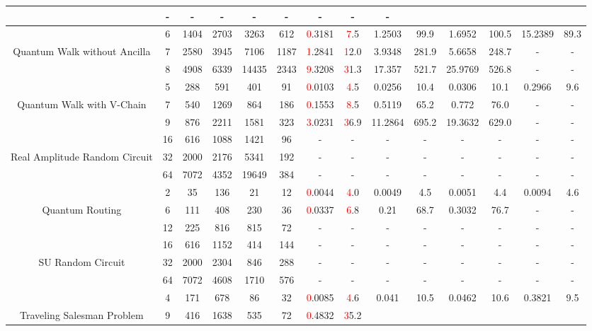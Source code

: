 \begin{table}[htb]
{\begin{tabular}{|c|c|c|c|c|c|c|c|c|c|c|c|c|c|}
 & - & -
 & - & -
 & - & -
 & - & -
 \\
\hline
 & 
6 & 1404 & 2703 & 3263 & 612
 & \textcolor{red}0.3181 & \textcolor{red}7.5
 & 1.2503 & 99.9
 & 1.6952 & 100.5
 & 15.2389 & 89.3
 \\
Quantum Walk without Ancilla & 
7 & 2580 & 3945 & 7106 & 1187
 & \textcolor{red}1.2841 & \textcolor{red}12.0
 & 3.9348 & 281.9
 & 5.6658 & 248.7
 & - & -
 \\
 & 
8 & 4908 & 6339 & 14435 & 2343
 & \textcolor{red}9.3208 & \textcolor{red}31.3
 & 17.357 & 521.7
 & 25.9769 & 526.8
 & - & -
 \\
\hline
 & 
5 & 288 & 591 & 401 & 91
 & \textcolor{red}0.0103 & \textcolor{red}4.5
 & 0.0256 & 10.4
 & 0.0306 & 10.1
 & 0.2966 & 9.6
 \\
Quantum Walk with V-Chain & 
7 & 540 & 1269 & 864 & 186
 & \textcolor{red}0.1553 & \textcolor{red}8.5
 & 0.5119 & 65.2
 & 0.772 & 76.0
 & - & -
 \\
 & 
9 & 876 & 2211 & 1581 & 323
 & \textcolor{red}3.0231 & \textcolor{red}36.9
 & 11.2864 & 695.2
 & 19.3632 & 629.0
 & - & -
 \\
\hline
 & 
16 & 616 & 1088 & 1421 & 96
 & - & -
 & - & -
 & - & -
 & - & -
 \\
Real Amplitude Random Circuit & 
32 & 2000 & 2176 & 5341 & 192
 & - & -
 & - & -
 & - & -
 & - & -
 \\
 & 
64 & 7072 & 4352 & 19649 & 384
 & - & -
 & - & -
 & - & -
 & - & -
 \\
\hline
 & 
2 & 35 & 136 & 21 & 12
 & \textcolor{red}0.0044 & \textcolor{red}4.0
 & 0.0049 & 4.5
 & 0.0051 & 4.4
 & 0.0094 & 4.6
 \\
Quantum Routing & 
6 & 111 & 408 & 230 & 36
 & \textcolor{red}0.0337 & \textcolor{red}6.8
 & 0.21 & 68.7
 & 0.3032 & 76.7
 & - & -
 \\
 & 
12 & 225 & 816 & 815 & 72
 & - & -
 & - & -
 & - & -
 & - & -
 \\
\hline
 & 
16 & 616 & 1152 & 414 & 144
 & - & -
 & - & -
 & - & -
 & - & -
 \\
SU Random Circuit & 
32 & 2000 & 2304 & 846 & 288
 & - & -
 & - & -
 & - & -
 & - & -
 \\
 & 
64 & 7072 & 4608 & 1710 & 576
 & - & -
 & - & -
 & - & -
 & - & -
 \\
\hline
 & 
4 & 171 & 678 & 86 & 32
 & \textcolor{red}0.0085 & \textcolor{red}4.6
 & 0.041 & 10.5
 & 0.0462 & 10.6
 & 0.3821 & 9.5
 \\
Traveling Salesman Problem & 
9 & 416 & 1638 & 535 & 72
 & \textcolor{red}0.4832 & \textcolor{red}35.2

\end{tabular}}
\end{table}
